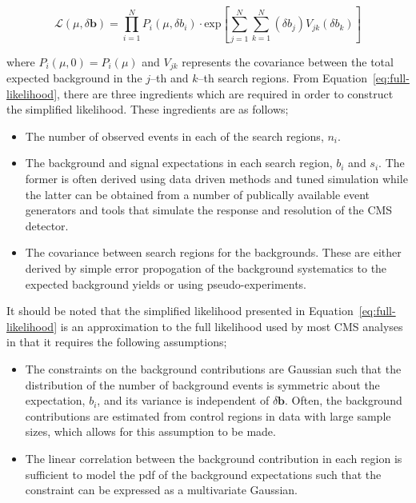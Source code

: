 \begin{equation}
\mathcal{L}(\mu, \delta \mathbf{b}) = \prod_{i=1}^{N} P_{i}(\mu,\delta b_{i}) \cdot \mathrm{exp} \left[ \sum_{j=1}^{N}\sum_{k=1}^{N} (\delta b_{j}) V_{jk} (\delta b_{k}) \right]
\label{eq:full-likelihood}
\end{equation}

where $P_{i}(\mu,0)=P_{i}(\mu)$ and $V_{jk}$ represents the covariance between
the total expected background in the $j$--th and $k$--th search regions.
From Equation~\ref{eq:full-likelihood}, there are three ingredients which are 
required in order to construct the simplified likelihood. These ingredients are as follows; 

\begin{itemize}
\item {The number of observed events in each of the search regions, $n_{i}$.}
\item {The background and signal expectations in each search region, $b_{i}$ and $s_{i}$. The former is often derived using data driven methods and 
tuned simulation while the latter can be obtained from a number of publically available event generators and tools that simulate the response and resolution of the CMS detector.}
\item {The covariance between search regions for the backgrounds. These are either derived by simple error propogation of the background systematics to the expected background yields or 
using pseudo-experiments.}
\end{itemize}
 
It should be noted that the simplified likelihood presented in Equation~\ref{eq:full-likelihood} is an approximation to the full likelihood used 
by most CMS analyses in that it requires the following assumptions;

\begin{itemize}
\item{The constraints on the background contributions are Gaussian such that the distribution of the number of background events is symmetric about the expectation, $b_{i}$, 
and its variance is independent of $\delta \mathbf{b}$. Often, the background contributions are estimated from control regions in data with large sample sizes, which allows for this 
assumption to be made.}

\item{The linear correlation between the background contribution in each region is sufficient to model the  pdf of the background expectations such that the constraint 
can be expressed as a multivariate Gaussian.}
\end{itemize}


